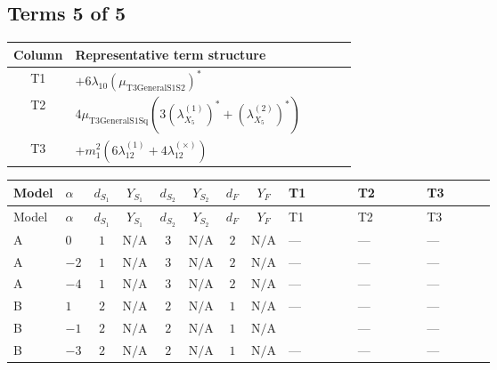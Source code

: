 \documentclass[8pt]{article}
\begin{document}
\begin{landscape}
\subsection*{Terms 5 of 5}
\begin{center}
\begin{tabular}{@{}c >{\raggedright\arraybackslash}p{0.82\linewidth}@{}}
\toprule
Column & Representative term structure \\
\midrule
T1 & \(\displaystyle +6 {\lambda_{10}} \left({\mu_{\mathrm{T3GeneralS1S2}}}\right)^{*}\) \\
\midrule
T2 & \(\displaystyle 4 {\mu_{\mathrm{T3GeneralS1Sq}}} (3 \left({\lambda_{X_{5}}^{(1)}}\right)^{*}+\left({\lambda_{X_{5}}^{(2)}}\right)^{*})\) \\
\midrule
T3 & \(\displaystyle +{m_1^2} (6 {\lambda_{12}^{(1)}}+4 {\lambda_{12}^{(\times)}})\) \\
\midrule
\bottomrule
\end{tabular}
\end{center}
\smallskip
\tiny
\begin{longtable}{@{}llcccccc >{\raggedright\arraybackslash}p{0.21\linewidth} >{\raggedright\arraybackslash}p{0.21\linewidth} >{\raggedright\arraybackslash}p{0.21\linewidth}@{}}
\toprule
Model & $\alpha$ & $d_{S_1}$ & $Y_{S_1}$ & $d_{S_2}$ & $Y_{S_2}$ & $d_F$ & $Y_F$ & T1 & T2 & T3 \\
\midrule
\endfirsthead
\toprule
Model & $\alpha$ & $d_{S_1}$ & $Y_{S_1}$ & $d_{S_2}$ & $Y_{S_2}$ & $d_F$ & $Y_F$ & T1 & T2 & T3 \\
\midrule
\endhead
A & $0$ & $1$ & $\text{N/A}$ & $3$ & $\text{N/A}$ & $2$ & $\text{N/A}$ & --- & --- & --- \\
\midrule
A & $-2$ & $1$ & $\text{N/A}$ & $3$ & $\text{N/A}$ & $2$ & $\text{N/A}$ & --- & --- & --- \\
\midrule
A & $-4$ & $1$ & $\text{N/A}$ & $3$ & $\text{N/A}$ & $2$ & $\text{N/A}$ & --- & --- & --- \\
\midrule
B & $1$ & $2$ & $\text{N/A}$ & $2$ & $\text{N/A}$ & $1$ & $\text{N/A}$ & --- & --- & --- \\
\midrule
B & $-1$ & $2$ & $\text{N/A}$ & $2$ & $\text{N/A}$ & $1$ & $\text{N/A}$ & \scriptsize\adjustbox{max width=\linewidth}{$\begin{gathered} +6 {\lambda_{10}} \left({\mu_{\mathrm{T3GeneralS1S2}}}\right)^{*}\end{gathered}$} & --- & --- \\
\midrule
B & $-3$ & $2$ & $\text{N/A}$ & $2$ & $\text{N/A}$ & $1$ & $\text{N/A}$ & --- & --- & --- \\

\end{longtable}
\end{landscape}
\end{document}
